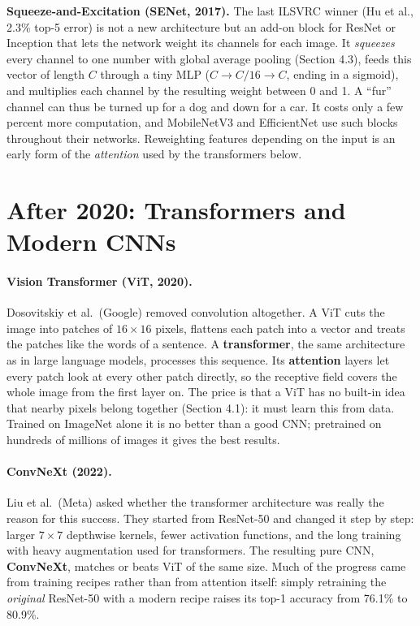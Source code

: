 \documentclass[12pt, a4paper]{article}
\begin{document}
\begin{notebox}
  \textbf{Squeeze-and-Excitation (SENet, 2017).} The last ILSVRC winner
  (Hu et al., 2.3\% top-5 error) is not a new architecture but an add-on block
  for ResNet or Inception that lets the network weight its channels for each
  image. It \emph{squeezes} every channel to one number with global average
  pooling (Section 4.3), feeds this vector of length $C$ through a tiny MLP
  ($C \to C/16 \to C$, ending in a sigmoid), and multiplies each channel by
  the resulting weight between 0 and 1. A ``fur'' channel can thus be turned
  up for a dog and down for a car. It costs only a few percent more
  computation, and MobileNetV3 and EfficientNet use such blocks throughout
  their networks. Reweighting features depending on the input is an early form of the
  \emph{attention} used by the transformers below.
\end{notebox}

\section{After 2020: Transformers and Modern CNNs}

\paragraph{Vision Transformer (ViT, 2020).}
Dosovitskiy et al.\ (Google) removed convolution altogether. A ViT cuts the
image into patches of $16 \times 16$ pixels, flattens each patch into a
vector and treats the patches like the words of a sentence. A
\textbf{transformer}, the same architecture as in large language models,
processes this sequence. Its \textbf{attention} layers let every patch look at
every other patch directly, so the receptive field covers the whole image from
the first layer on. The price is that a ViT has no built-in idea that nearby
pixels belong together (Section 4.1): it must learn this from data. Trained on
ImageNet alone it is no better than a good CNN; pretrained on hundreds of
millions of images it gives the best results.

\paragraph{ConvNeXt (2022).}
Liu et al.\ (Meta) asked whether the transformer architecture was really the
reason for this success. They started from ResNet-50 and changed it step by
step: larger $7\times7$ depthwise kernels, fewer activation functions, and the
long training with heavy augmentation used for transformers. The resulting
pure CNN, \textbf{ConvNeXt}, matches or beats ViT of the same size. Much of
the progress came from training recipes rather than from attention itself:
simply retraining the \emph{original} ResNet-50 with a modern recipe raises
its top-1 accuracy from 76.1\% to 80.9\%.
\end{document}
